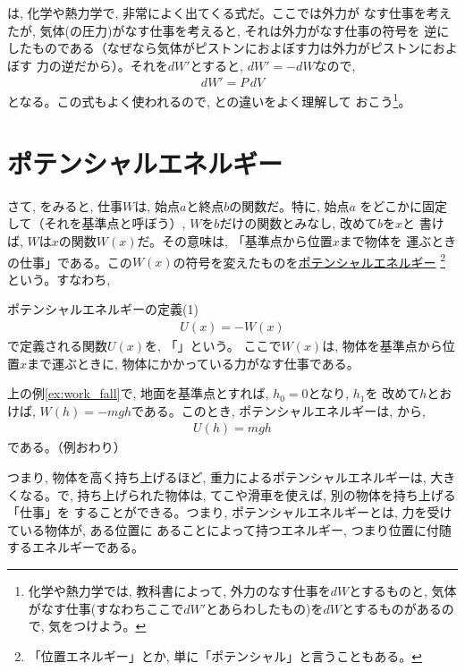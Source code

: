 は, 化学や熱力学で, 非常によく出てくる式だ。ここでは外力が
なす仕事を考えたが, 気体(の圧力)がなす仕事を考えると, それは外力がなす仕事の符号を
逆にしたものである（なぜなら気体がピストンにおよぼす力は外力がピストンにおよぼす
力の逆だから）。それを$dW'$とすると, $dW'=-dW$なので, 
\begin{eqnarray}
dW'=P\,dV
\end{eqnarray}
となる。この式もよく使われるので, との違いをよく理解して
おこう\footnote{化学や熱力学では, 教科書によって, 外力のなす仕事を$dW$とするものと, 
気体がなす仕事(すなわちここで$dW'$とあらわしたもの)を$dW$とするものがあるので, 
気をつけよう。}。
\hv


\section{ポテンシャルエネルギー}

さて, をみると, 仕事$W$は, 始点$a$と終点$b$の関数だ。特に, 始点$a$
をどこかに固定して（それを基準点と呼ぼう）, $W$を$b$だけの関数とみなし, 改めて$b$を$x$と
書けば, $W$は$x$の関数$W(x)$だ。その意味は, 「基準点から位置$x$まで物体を
運ぶときの仕事」である。この$W(x)$の符号を変えたものを\underline{ポテンシャルエネルギー}
\footnote{「位置エネルギー」とか, 単に「ポテンシャル」と言うこともある。}という。すなわち, 
\begin{itembox}{ポテンシャルエネルギーの定義(1)}
\begin{eqnarray}
U(x)=-W(x)\label{eq:potential}
\end{eqnarray}
で定義される関数$U(x)$を, 「」という。
ここで$W(x)$は, 物体を基準点から位置$x$まで運ぶときに, 物体にかかっている力がなす仕事である。
\end{itembox}

\begin{exmpl}\label{ex:gravity_potential_mgh}
上の例\ref{ex:work_fall}で, 地面を基準点とすれば, $h_0=0$となり, $h_1$を
改めて$h$とおけば, $W(h)=-mgh$である。このとき, ポテンシャルエネルギーは, 
から, 
\begin{eqnarray}
U(h)=mgh\label{eq:potential_g}
\end{eqnarray}
である。（例おわり）
\end{exmpl}

つまり, 物体を高く持ち上げるほど, 重力によるポテンシャルエネルギーは, 
大きくなる。で, 持ち上げられた物体は, てこや滑車を使えば, 別の物体を持ち上げる「仕事」を
することができる。つまり, ポテンシャルエネルギーとは, 力を受けている物体が, ある位置に
あることによって持つエネルギー, つまり位置に付随するエネルギーである。


